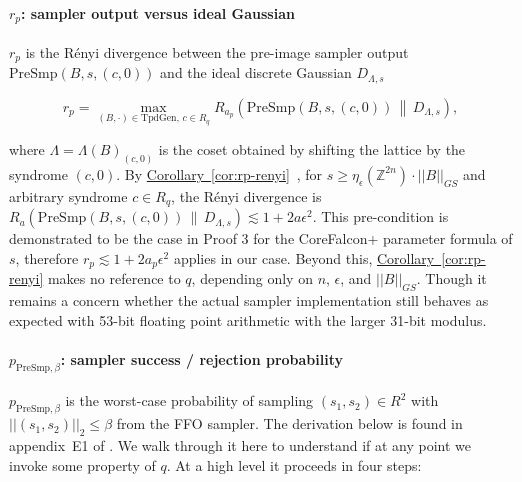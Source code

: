 \paragraph{\texorpdfstring{\(r_p\): sampler output versus ideal
Gaussian}{r\_p: sampler output versus ideal Gaussian}}\label{r_p-sampler-output-versus-ideal-gaussian}

\(r_p\) is the Rényi divergence between the pre-image sampler
output \(\mathrm{PreSmp}(B,s,(c,0))\) and the ideal discrete Gaussian
\(D_{\Lambda,s}\)

\[
r_p = \max_{(B,\cdot)\in \mathrm{TpdGen},\, c\in R_q} R_{a_p}\!\left( \mathrm{PreSmp}(B,s,(c,0)) \,\middle\|\, D_{\Lambda,s} \right),
\]

where \(\Lambda = \Lambda(B)_{(c,0)}\) is the coset obtained by shifting
the lattice by the syndrome \((c,0)\). By
\hyperref[cor:rp-renyi]{Corollary~\ref*{cor:rp-renyi}}~\cite{Fouque2024CoreFalcon},
for \(s \ge \eta_\epsilon(\mathbb{Z}^{2n}) \cdot ||B||_{GS}\) and arbitrary
syndrome \(c \in R_q\), the R\'enyi divergence is
\(R_a(\mathrm{PreSmp}(B,s,(c,0)) \,\|\, D_{\Lambda,s}) \lesssim 1 + 2a\epsilon^2\).
This pre-condition is demonstrated to be the case in Proof 3 for the CoreFalcon+ parameter formula 
of $s$, therefore $r_p \lesssim 1 + 2a_p\epsilon^2$ applies in our case.
Beyond this, \hyperref[cor:rp-renyi]{Corollary~\ref*{cor:rp-renyi}} makes no reference to \(q\), 
depending only on \(n\), \(\epsilon\), and \(||B||_{GS}\). Though it remains a concern whether the 
actual sampler implementation still behaves as expected with 53-bit floating point arithmetic with 
the larger 31-bit modulus. 

\paragraph{\texorpdfstring{\(p_{\mathrm{PreSmp},\beta}\): sampler
success / rejection
probability}{p\_\{\textbackslash mathrm\{PreSmp\},\textbackslash beta\}: sampler success / rejection probability}}\label{p_mathrmpresmpbeta-sampler-success-rejection-probability}

\(p_{\mathrm{PreSmp},\beta}\) is the worst-case probability of sampling
\((s_1, s_2) \in R^2\) with \(||(s_1,s_2)||_2 \le \beta\) from the FFO
sampler. The derivation below is found in appendix~E1 of
\cite{Fouque2024CoreFalcon}. We walk through it here to understand if at any point we invoke some property of $q$.
At a high level it proceeds in four steps:

